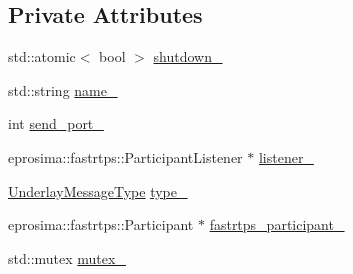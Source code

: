 \subsection*{Private Attributes}
\begin{DoxyCompactItemize}
\item 
std\-::atomic$<$ bool $>$ \hyperlink{classapollo_1_1cyber_1_1transport_1_1Participant_a76d3249cc1e74aa3877c23900df847e8}{shutdown\-\_\-}
\item 
std\-::string \hyperlink{classapollo_1_1cyber_1_1transport_1_1Participant_a2625e1ae6564f0c993948f94408d30c5}{name\-\_\-}
\item 
int \hyperlink{classapollo_1_1cyber_1_1transport_1_1Participant_a618c13275cdd3a4efb23cb22d1dc8de1}{send\-\_\-port\-\_\-}
\item 
eprosima\-::fastrtps\-::\-Participant\-Listener $\ast$ \hyperlink{classapollo_1_1cyber_1_1transport_1_1Participant_a3d54979f405234c2951247230db1c179}{listener\-\_\-}
\item 
\hyperlink{classapollo_1_1cyber_1_1transport_1_1UnderlayMessageType}{Underlay\-Message\-Type} \hyperlink{classapollo_1_1cyber_1_1transport_1_1Participant_ab125364c51c025db996d0ef245b4a0e0}{type\-\_\-}
\item 
eprosima\-::fastrtps\-::\-Participant $\ast$ \hyperlink{classapollo_1_1cyber_1_1transport_1_1Participant_a5c915b44cfcdcdb1f119d32dbd09fe09}{fastrtps\-\_\-participant\-\_\-}
\item 
std\-::mutex \hyperlink{classapollo_1_1cyber_1_1transport_1_1Participant_af1722d7b981059db589b92ac6f128665}{mutex\-\_\-}
\end{DoxyCompactItemize}


